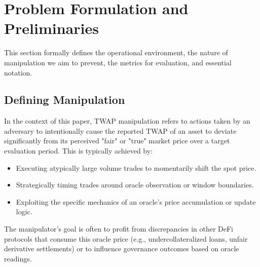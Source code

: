 \documentclass{article}
\begin{document}
\section{Problem Formulation and Preliminaries}
\label{sec:problem}
This section formally defines the operational environment, the nature of manipulation we aim to prevent, the metrics for evaluation, and essential notation.

\subsection{Defining Manipulation}
In the context of this paper, TWAP manipulation refers to actions taken by an adversary to intentionally cause the reported TWAP of an asset to deviate significantly from its perceived "fair" or "true" market price over a target evaluation period. This is typically achieved by:
\begin{itemize}
    \item Executing atypically large volume trades to momentarily shift the spot price.
    \item Strategically timing trades around oracle observation or window boundaries.
    \item Exploiting the specific mechanics of an oracle's price accumulation or update logic.
\end{itemize}
The manipulator's goal is often to profit from discrepancies in other DeFi protocols that consume this oracle price (e.g., undercollateralized loans, unfair derivative settlements) or to influence governance outcomes based on oracle readings.
\end{document}
